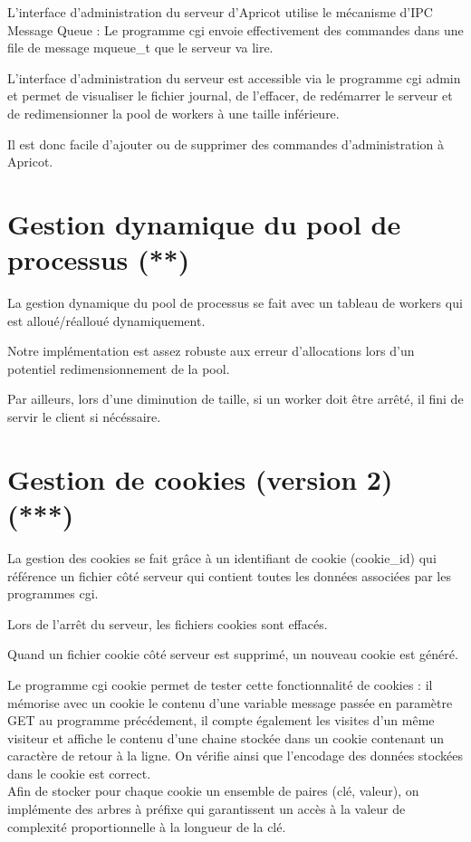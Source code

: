 \documentclass{article}
\begin{document}
L'interface d'administration du serveur d'Apricot utilise le mécanisme d'IPC Message Queue :
Le programme cgi envoie effectivement des commandes dans une file de message mqueue\_t que le serveur va lire.

L'interface d'administration du serveur est accessible via le programme cgi admin et permet de visualiser le fichier
journal, de l'effacer, de redémarrer le serveur et de redimensionner la pool de workers à une taille inférieure.

Il est donc facile d'ajouter ou de supprimer des commandes d'administration à Apricot.

\section{Gestion dynamique du pool de processus (**)}

La gestion dynamique du pool de processus se fait avec un tableau de workers qui est alloué/réalloué dynamiquement.

Notre implémentation est assez robuste aux erreur d'allocations lors d'un potentiel redimensionnement de la pool.

Par ailleurs, lors d'une diminution de taille, si un worker doit être arrêté, il fini de servir le client si nécéssaire.

\section{Gestion de cookies (version 2) (***)}

La gestion des cookies se fait grâce à un identifiant de cookie (cookie\_id) qui référence un fichier côté serveur qui contient toutes les données associées par les programmes cgi.

Lors de l'arrêt du serveur, les fichiers cookies sont effacés.

Quand un fichier cookie côté serveur est supprimé, un nouveau cookie est généré.

Le programme cgi cookie permet de tester cette fonctionnalité de cookies : il mémorise avec un cookie le contenu d'une
variable message passée en paramètre GET au programme précédement, il compte également les visites d'un même visiteur
et affiche le contenu d'une chaine stockée dans un cookie contenant un caractère de retour à la ligne. On vérifie ainsi
que l'encodage des données stockées dans le cookie est correct.\\

Afin de stocker pour chaque cookie un ensemble de paires (clé, valeur), on implémente des arbres à préfixe qui garantissent
un accès à la valeur de complexité proportionnelle à la longueur de la clé.
\end{document}
